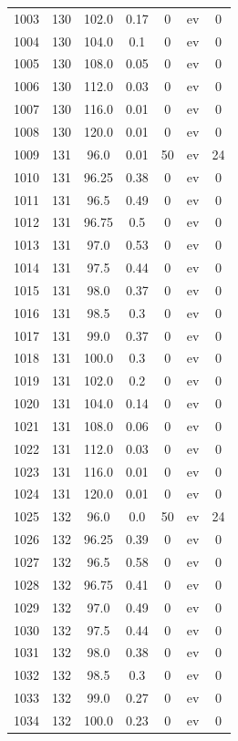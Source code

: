 \documentclass[12pt,a4paper]{article}
\begin{document}
\begin{tabular}{r|cccccc}
	1003 & 130 & 102.0 & 0.17 & 0 & ev & 0 \\
	1004 & 130 & 104.0 & 0.1 & 0 & ev & 0 \\
	1005 & 130 & 108.0 & 0.05 & 0 & ev & 0 \\
	1006 & 130 & 112.0 & 0.03 & 0 & ev & 0 \\
	1007 & 130 & 116.0 & 0.01 & 0 & ev & 0 \\
	1008 & 130 & 120.0 & 0.01 & 0 & ev & 0 \\
	1009 & 131 & 96.0 & 0.01 & 50 & ev & 24 \\
	1010 & 131 & 96.25 & 0.38 & 0 & ev & 0 \\
	1011 & 131 & 96.5 & 0.49 & 0 & ev & 0 \\
	1012 & 131 & 96.75 & 0.5 & 0 & ev & 0 \\
	1013 & 131 & 97.0 & 0.53 & 0 & ev & 0 \\
	1014 & 131 & 97.5 & 0.44 & 0 & ev & 0 \\
	1015 & 131 & 98.0 & 0.37 & 0 & ev & 0 \\
	1016 & 131 & 98.5 & 0.3 & 0 & ev & 0 \\
	1017 & 131 & 99.0 & 0.37 & 0 & ev & 0 \\
	1018 & 131 & 100.0 & 0.3 & 0 & ev & 0 \\
	1019 & 131 & 102.0 & 0.2 & 0 & ev & 0 \\
	1020 & 131 & 104.0 & 0.14 & 0 & ev & 0 \\
	1021 & 131 & 108.0 & 0.06 & 0 & ev & 0 \\
	1022 & 131 & 112.0 & 0.03 & 0 & ev & 0 \\
	1023 & 131 & 116.0 & 0.01 & 0 & ev & 0 \\
	1024 & 131 & 120.0 & 0.01 & 0 & ev & 0 \\
	1025 & 132 & 96.0 & 0.0 & 50 & ev & 24 \\
	1026 & 132 & 96.25 & 0.39 & 0 & ev & 0 \\
	1027 & 132 & 96.5 & 0.58 & 0 & ev & 0 \\
	1028 & 132 & 96.75 & 0.41 & 0 & ev & 0 \\
	1029 & 132 & 97.0 & 0.49 & 0 & ev & 0 \\
	1030 & 132 & 97.5 & 0.44 & 0 & ev & 0 \\
	1031 & 132 & 98.0 & 0.38 & 0 & ev & 0 \\
	1032 & 132 & 98.5 & 0.3 & 0 & ev & 0 \\
	1033 & 132 & 99.0 & 0.27 & 0 & ev & 0 \\
	1034 & 132 & 100.0 & 0.23 & 0 & ev & 0 \\

\end{tabular}
\end{document}
